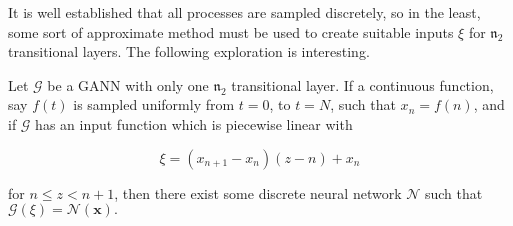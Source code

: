 It is well established that all processes are sampled discretely, so in the least, some sort of approximate method must be used to create suitable inputs $\xi$ for $\mathfrak{n}_2$ transitional layers. The following exploration is interesting. 

\begin{theorem}
	Let $\mathcal{G}$ be a GANN with only one $\mathfrak{n}_2$ transitional layer. If a continuous function, say $f(t)$ is sampled uniformly from $t = 0$, to $t = N$, such that $x_n = f(n)$, and if $\mathcal{G}$ has an input function which is piecewise linear with

	\begin{equation}
	\xi = \left(x_{n+1} - x_n\right)\left(z - n\right) + x_n
	\end{equation}

	for $n \leq z < n+1$, then there exist some discrete neural network $\mathcal{N}$ such that $\mathcal{G}(\xi) = \mathcal{N}(\pmb{x}).$
\end{theorem}
